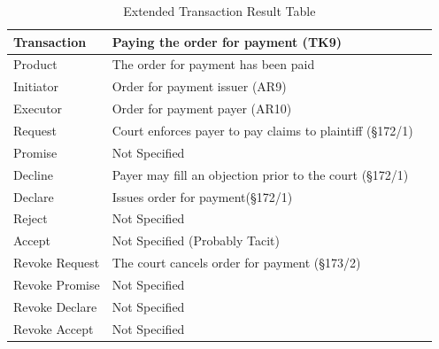 \begin{landscape}
\begin{table}[h]
\caption{Extended Transaction Result Table}
\label{tab:etrt}
\begin{tabular}{|l||l|l|}
\hline
Transaction  &  Paying the order for payment (TK9) \\ \hline
Product      &  The order for payment has been paid \\ \hline
Initiator      &  Order for payment issuer (AR9) \\ \hline
Executor       &  Order for payment payer (AR10) \\ \hline
Request        &    Court enforces payer to pay claims to plaintiff (\S172/1)
  \\ \hline
Promise        &    Not Specified   \\ \hline
Decline        &  Payer may fill an objection prior to the court (\S172/1)  \\ \hline
Declare        &  Issues order for payment(\S172/1)  \\ \hline
Reject         &  Not Specified   \\ \hline
Accept         & Not Specified (Probably Tacit) \\ \hline
Revoke Request & The court cancels order for payment (\S173/2)       \\ \hline
Revoke Promise & Not Specified  \\ \hline
Revoke Declare & Not Specified      \\ \hline
Revoke Accept  &  Not Specified \\ \hline
\end{tabular}
\end{table}


\end{landscape}
